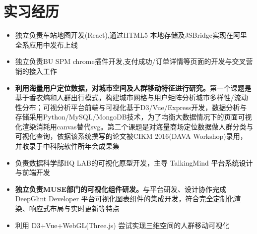 \documentclass{resume}
\begin{document}


    \section{实习经历}
    \begin{itemize}
        \item 独立负责车站地图开发(React),通过HTML5 本地存储及JSBridge实现在阿里全系应用中发布上线
        \item 独立负责BU SPM chrome插件开发,支付成功/订单详情等页面的开发与交叉营销的接入工作
    \end{itemize}

    \begin{itemize}
        \item \textbf{利用海量用户定位数据，对城市空间及人群移动特征进行研究。}第一个课题是基于香农熵和人群出行模式，构建城市网格与用户矩阵分析城市多样性/流动性分布；可视分析平台前端与可视化基于D3/Vue/Express开发，数据分析与存储采用Python/MySQL/MongoDB技术，为了均衡大数据情况下的页面可视化渲染消耗用canvas替代svg。第二个课题是对海量商场定位数据做人群分类与可视化查询，依据该系统撰写的论文被CIKM 2016(DAVA Workshop)录用，并收录于中科院软件所年会成果集
        \item 负责数据科学部HQ LAB的可视化原型开发，主导 TalkingMind 平台系统设计与前端开发
    \end{itemize}

    \begin{itemize}
        \item \textbf{独立负责MUSE部门的可视化组件研发。}与平台研发、设计协作完成 DeepGlint Developer 平台可视化图表组件的集成开发，符合完全定制化渲染、响应式布局与实时更新等特点
        \item 利用 D3+Vue+WebGL(Three.js) 尝试实现三维空间的人群移动可视化
    \end{itemize}
\end{document}
